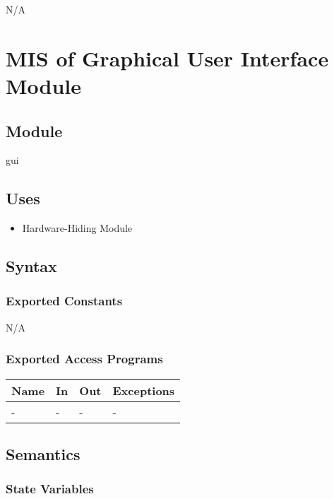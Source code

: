 \documentclass[12pt, titlepage]{article}
\begin{document}
\begin{itemize}
N/A

\section{MIS of Graphical User Interface Module} \label{MGUI}

\subsection{Module}

gui
\subsection{Uses}

\begin{itemize}
  \item Hardware-Hiding Module
\end{itemize}

\subsection{Syntax}

\subsubsection{Exported Constants}

N/A

\subsubsection{Exported Access Programs}

\begin{center}
\begin{tabular}{p{2cm} p{4cm} p{4cm} p{2cm}}
\hline
\textbf{Name} & \textbf{In} & \textbf{Out} & \textbf{Exceptions} \\
\hline
- & - & - & - \\
\hline
\end{tabular}
\end{center}

\subsection{Semantics}

\subsubsection{State Variables}


\end{itemize}
\end{document}
